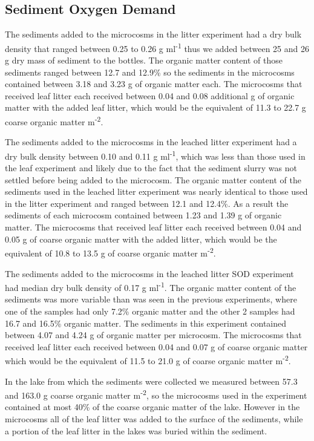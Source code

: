 \subsection{Sediment Oxygen Demand}
The sediments added to the microcosms in the litter experiment had a dry bulk density that ranged between 0.25 to 0.26 g ml\textsuperscript{-1} thus we added between 25 and 26 g dry mass of sediment to the bottles. The organic matter content of those sediments ranged between 12.7 and 12.9\% so the sediments in the microcosms contained between 3.18 and 3.23 g of organic matter each.  The microcosms that received leaf litter each received between 0.04 and 0.08 additional g of organic matter with the added leaf litter, which would be the equivalent of 11.3 to 22.7 g coarse organic matter m\textsuperscript{-2}. 

The sediments added to the microcosms in the leached litter experiment had a dry bulk density between 0.10 and 0.11 g ml\textsuperscript{-1}, which was less than those used in the leaf experiment and likely due to the fact that the sediment slurry was not settled before being added to the microcosm. The organic matter content of the sediments used in the leached litter experiment was nearly identical to those used in the litter experiment and ranged between 12.1 and 12.4\%. As a result the sediments of each microcosm contained between 1.23 and 1.39 g of organic matter. The microcosms that received leaf litter each received between 0.04 and 0.05 g of coarse organic matter with the added litter, which would be the equivalent of 10.8 to 13.5 g of coarse organic matter m\textsuperscript{-2}.

The sediments added to the microcosms in the leached litter SOD experiment had  median dry bulk density of 0.17 g ml\textsuperscript{-1}. The organic matter content of the sediments was more variable than was seen in the previous experiments, where one of the samples had only 7.2\% organic matter and the other 2 samples had 16.7 and 16.5\% organic matter. The sediments in this experiment contained between 4.07 and 4.24 g of organic matter per microcosm. The microcosms that received leaf litter each received between 0.04 and 0.07 g of coarse organic matter which would be the equivalent of 11.5 to 21.0 g of coarse organic matter m\textsuperscript{-2}.

In the lake from which the sediments were collected we measured between 57.3 and 163.0 g coarse organic matter m\textsuperscript{-2}, so the microcosms used in the experiment contained at most 40\% of the coarse organic matter of the lake. However in the microcosms all of the leaf litter was added to the surface of the sediments, while a portion of the leaf litter in the lakes was buried within the sediment.

